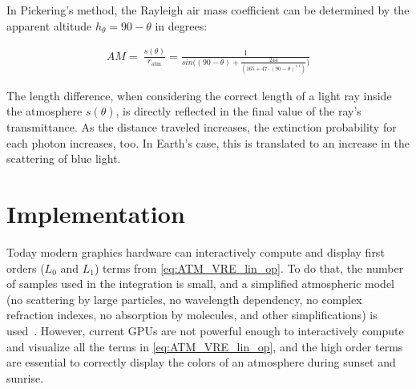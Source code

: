 \documentclass[journal]{vgtc}                %
\newcommand{\review}[1]{{\color{blue}#1}}
\begin{document}


In Pickering's method, the Rayleigh air mass coefficient can be determined by the apparent altitude $h_\theta = 90 - \theta$ in degrees:

\vspace*{-3mm}
{
\review{
  \small
\begin{align} \label{eq:airmass}
AM =\ \frac{s(\theta)}{r_{\text{atm}}} = \frac{1}{sin\Big((90 - \theta) + \frac{244}{(165 + 47\cdot(90 - \theta)^{1.1})}\Big)}
\end{align}
}
}
\vspace*{-3mm}


The length difference, when considering the correct length of a light ray inside the atmosphere \review{$s(\theta)$}, is directly reflected in the final value of the ray's transmittance. As the distance traveled increases, the extinction probability for each photon increases, too. In Earth's case, this is translated to an increase in the scattering of blue light.

\vspace*{-1mm}
\section{Implementation}

Today modern graphics hardware can interactively compute and display first orders ($L_0$ and $L_1$) terms from \autoref{eq:ATM_VRE_lin_op}. To do that, the number of samples used in the integration is small, and a simplified atmospheric model (no scattering by large particles, no wavelength dependency, no complex refraction indexes, no absorption by molecules, and other simplifications) is used~\cite{Hoffman:2002, ONeil2004}. However, current GPUs are not powerful enough to interactively compute and visualize all the terms in \autoref{eq:ATM_VRE_lin_op}, and the high order terms are essential to correctly display the colors of an atmosphere during sunset and sunrise.
\end{document}
